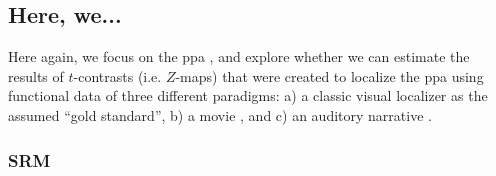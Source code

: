 \subsection{Here, we...}


Here again, we focus on the \ac{ppa} \citep[e.g.,][for
reviews]{epstein2014neural, aminoff2013role}, and explore whether we can
estimate the results of $t$-contrasts (i.e. $Z$-maps) that were created to
localize the \ac{ppa} using functional data of three different paradigms:
%
a) a classic visual localizer \citep{sengupta2016extension} as the assumed
``gold standard'',
%
b) a movie \citep{haeusler2022processing}, and
%
c) an auditory narrative \citep{haeusler2022processing}.


\subsubsection{SRM}




